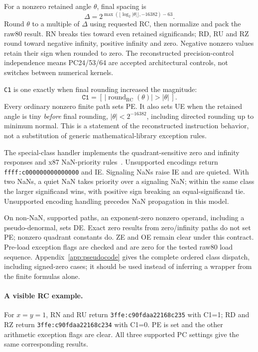 \documentclass[11pt]{article}
\newcommand{\rc}{\mathrm{RC}}
\newcommand{\insn}[1]{\texttt{#1}}
\newcommand{\hex}[1]{\texttt{#1}}
\begin{document}
For a nonzero retained angle $\theta$, final spacing is
\begin{equation}
 \Delta=2^{\max(\lfloor\log_2|\theta|\rfloor,-16382)-63}.
\end{equation}
Round $\theta$ to a multiple of $\Delta$ using requested RC, then normalize
and pack the raw80 result. RN breaks ties toward even retained significands;
RD, RU and RZ round toward negative infinity, positive infinity and zero.
Negative nonzero values retain their sign when rounded to zero. The
reconstructed precision-control independence means PC24/53/64 are accepted
architectural controls, not switches between numerical kernels.

\insn{C1} is one exactly when final rounding increased the magnitude:
\begin{equation}
 \insn{C1}=[\,|\operatorname{round}_{\rc}(\theta)|>|\theta|\,].
\end{equation}
Every ordinary nonzero finite path sets PE. It also sets UE when the
retained angle is tiny \emph{before} final rounding,
$|\theta|<2^{-16382}$, including directed rounding up to minimum normal.
This is a statement of the reconstructed instruction behavior, not a
substitution of generic mathematical-library exception rules.

The special-class handler implements the quadrant-sensitive zero and
infinity responses and x87 NaN-priority rules~\cite{intel2,intel1}.
Unsupported encodings return \hex{ffff:c000000000000000} and IE.
Signaling NaNs raise IE and are quieted. With two NaNs, a quiet NaN takes
priority over a signaling NaN; within the same class the larger significand
wins, with positive sign breaking an equal-significand tie. Unsupported
encoding handling precedes NaN propagation in this model.

On non-NaN, supported paths, an exponent-zero nonzero operand, including a
pseudo-denormal, sets DE. Exact zero results from zero/infinity paths do
not set PE; nonzero quadrant constants do. ZE and OE remain clear under
this contract. Pre-load exception flags are checked and are zero for the
tested raw80 load sequence. Appendix~\ref{app:pseudocode} gives the complete
ordered class dispatch, including signed-zero cases; it should be used
instead of inferring a wrapper from the finite formulas alone.

\paragraph{A visible RC example.}
For $x=y=1$, RN and RU return \hex{3ffe:c90fdaa22168c235} with C1=1;
RD and RZ return \hex{3ffe:c90fdaa22168c234} with C1=0. PE is set and
the other arithmetic exception flags are clear. All three supported PC
settings give the same corresponding results.
\end{document}
